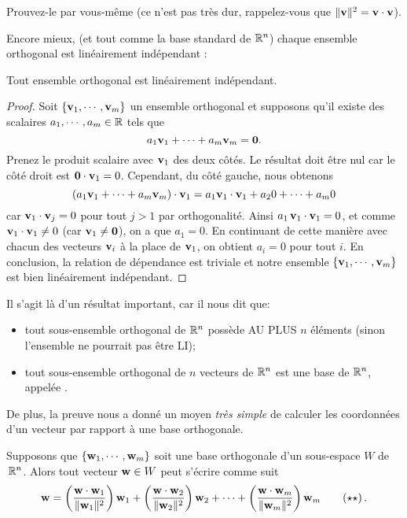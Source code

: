 Prouvez-le par vous-même  (ce n'est pas très dur, rappelez-vous que $\|\mathbf{v}\|^2= \mathbf{v}\cdot \mathbf{v}$).

Encore mieux, (et tout comme la base standard de $\mathbb{R}^n$) chaque ensemble orthogonal est linéairement indépendant :

\begin{theorem}\label{theorem:orthogLI}
Tout ensemble orthogonal est linéairement indépendant.
\end{theorem}


\begin{proof}
Soit $\{\mathbf{v}_1, \cdots, \mathbf{v}_m\}$ un ensemble orthogonal et 
supposons qu'il existe des scalaires $a_1, \cdots, a_m\in\mathbb{R}$ tels que
$$
a_1\mathbf{v}_1 + \cdots + a_m\mathbf{v}_m = \mathbf{0}.
$$
Prenez le produit scalaire avec $\mathbf{v}_1$ des deux côtés. Le résultat doit être nul car le côté droit est $\mathbf{0}\cdot\mathbf{v}_1 = 0$. 
Cependant, du côté gauche, nous obtenons
$$
(a_1\mathbf{v}_1 + \cdots + a_m\mathbf{v}_m)\cdot\mathbf{v}_1 = a_1 \mathbf{v}_1 \cdot \mathbf{v}_1 + a_2 0 + \cdots +a_m 0
$$
car $\mathbf{v}_1 \cdot \mathbf{v}_j = 0$ pour tout $j>1$ par orthogonalité. Ainsi $a_1\, \mathbf{v}_1\cdot\mathbf{v}_1=0$, et comme$\mathbf{v}_1 \cdot \mathbf{v}_1 \neq 0$
(car $\mathbf{v}_1 \neq \mathbf{0}$), on a que $a_1 = 0$.
En continuant de cette manière avec chacun des vecteurs $\mathbf{v}_i$ à la place de $\mathbf{v}_1$, on obtient $a_i=0$ pour
tout $i$. En conclusion, la relation de dépendance est triviale et notre ensemble $\{\mathbf{v}_1, \cdots, \mathbf{v}_m\}$ est bien linéairement indépendant.
\end{proof}

Il s'agit là d'un r\'esultat important, car il nous dit que:
\begin{itemize}
\item tout sous-ensemble orthogonal de $\mathbb{R}^n$ possède AU PLUS $n$ éléments (sinon l'ensemble ne pourrait pas être LI);
\item tout sous-ensemble orthogonal de $n$ vecteurs de $\mathbb{R}^n$ est une base de $\mathbb{R}^n$, appelée .
\end{itemize}
De plus, la preuve nous a donné un moyen {\it très simple} de calculer les
coordonnées d'un vecteur par rapport à une base orthogonale.

\begin{theorem}\label{expansion}
Supposons que $\{\mathbf{w}_1, \cdots, \mathbf{w}_m\}$ soit une base orthogonale d'un sous-espace $W$ de $\,\mathbb{R}^n$.
Alors tout vecteur $\mathbf{w} \in W$ peut s'écrire comme suit
\begin{equation*}
\mathbf{w} = \left( \frac{  \mathbf{w} \cdot\mathbf{w}_1}{\Vert \mathbf{w}_1 \Vert^2} \right) \mathbf{w}_1 +
  \left( \frac{\mathbf{w} \cdot\mathbf{w}_2}{\Vert \mathbf{w}_2 \Vert^2} \right) \mathbf{w}_2 + \cdots +
 \left( \frac{\mathbf{w} \cdot\mathbf{w}_m}{\Vert \mathbf{w}_m \Vert^2} \right) \mathbf{w}_m
 \tag{$\star\star$}\label{expand} \,.\end{equation*}
\end{theorem}

